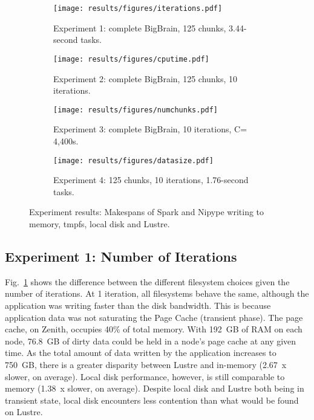 \documentclass{IEEEtran}
\begin{document}

\begin{figure*}
\begin{subfigure}{\columnwidth}
    \centering
    \texttt{[image: results/figures/iterations.pdf]}
    \caption{Experiment 1: complete BigBrain, 125 chunks, 3.44-second tasks.}\label{fig:iterations}
\end{subfigure}
\begin{subfigure}{\columnwidth}
    \centering
    \texttt{[image: results/figures/cputime.pdf]}
    \caption{Experiment 2: complete BigBrain, 125 chunks, 10 iterations.}\label{fig:cputime}
\end{subfigure}
\begin{subfigure}{\columnwidth}
    \centering
    \texttt{[image: results/figures/numchunks.pdf]}
    \caption{Experiment 3: complete BigBrain, 10 iterations, C= 4,400s.}\label{fig:numchunks}
\end{subfigure}
\begin{subfigure}{\columnwidth}
    \centering
    \texttt{[image: results/figures/datasize.pdf]}
    \caption{Experiment 4: 125 chunks, 10 iterations, 1.76-second tasks.}\label{fig:datasize}
\end{subfigure}
\caption{Experiment results: Makespans of Spark and Nipype writing to memory, tmpfs, local  disk and Lustre.}
\label{fig:results}
\end{figure*}
\subsection{Experiment 1: Number of Iterations}

Fig.~\ref{fig:iterations} shows the difference between the different 
filesystem choices given the number of iterations. At 1 iteration, all 
filesystems behave the same, although the application was writing faster than the
disk bandwidth. This is because application data was not saturating the Page Cache
(transient phase). The page cache, on Zenith, occupies 40\% of 
total memory. With 192~GB of RAM on each node, 76.8~GB of 
dirty data could be held in a node's page cache at any given time.
As the total amount of data written by the 
application increases to 750~GB, there is a greater disparity between 
Lustre and in-memory (2.67~x slower, on average). Local disk 
performance, however, 
is still comparable to memory (1.38~x slower, on average). Despite local disk and 
Lustre both being in transient state, local disk encounters less contention 
than what would be found on Lustre. 
\end{document}
